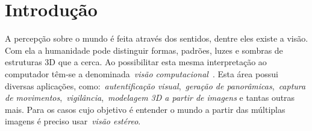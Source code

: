 \section{Introdução}
    \label{sec:intro}
A percepção sobre o mundo é feita através dos sentidos, dentre eles existe a visão. Com ela a humanidade pode distinguir formas, padrões, luzes e sombras de estruturas 3D que a cerca. Ao possibilitar esta mesma interpretação ao computador têm-se a denominada~\emph{visão computacional}~\citep{Szeliski2012}. Esta área possui diversas aplicações, como:~\emph{autentificação visual},~\emph{geração de panorâmicas},~\emph{captura de movimentos},~\emph{vigilância},~\emph{modelagem 3D a partir de imagens} e tantas outras mais. Para os casos cujo objetivo é entender o mundo a partir das múltiplas imagens é preciso usar~\emph{visão estéreo}.





